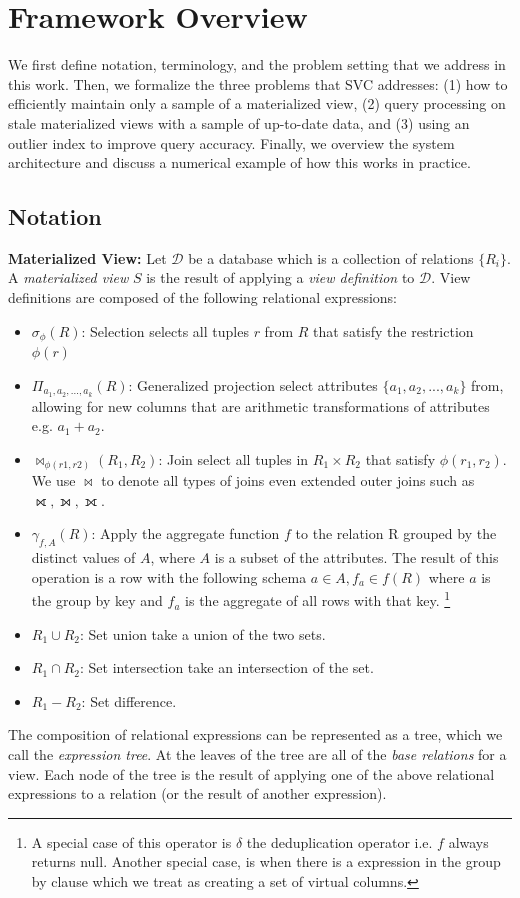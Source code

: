 \section{Framework Overview}\label{sec-arch}
We first define notation, terminology, and the problem setting that we address in this work.
Then, we formalize the three problems that SVC addresses: (1) how to efficiently maintain only a sample of a materialized view, (2) query processing on stale materialized views with a sample of up-to-date data, and (3) using an outlier index to improve query accuracy.
Finally, we overview the system architecture and discuss a numerical example of how this works in practice.

\subsection{Notation}\label{notation}
\noindent \textbf{Materialized View:} Let $\mathcal{D}$ be a database which is a collection of relations $\{R_i\}$. A \emph{materialized view} $S$ is the result of applying a \emph{view definition} to $\mathcal{D}$. 
View definitions are composed of the following relational expressions:
\begin{itemize}[noitemsep] \sloppy
	\item $\sigma_{\phi}(R)$: Selection selects all tuples $r$ from $R$ that satisfy the restriction $\phi (r)$ 
	\item $\Pi_{a_1,a_2,...,a_k}(R)$: Generalized projection select attributes $\{a_1,a_2,...,a_k\}$ from, allowing for new columns that are arithmetic transformations of attributes e.g. $a_1+a_2$.
	\item $\bowtie_{\phi (r1,r2)}(R_1,R_2)$: Join select all tuples in $R_1 \times R_2$ that satisfy $\phi (r_1,r_2)$. We use $\bowtie$ to denote all types of joins even extended outer joins such as $\rightouterjoin,\leftouterjoin,\fullouterjoin$.
	\item $\gamma_{f,A}(R)$: Apply the aggregate function $f$ to the relation R grouped by the distinct values of $A$, where $A$ is a subset of the attributes. The result of this operation is a row with the following schema $a \in A, f_a \in f(R)$ where $a$ is the group by key and $f_a$ is the aggregate of all rows with that key.   \footnote{A special case of this operator is $\delta$ the deduplication operator i.e. $f$ always returns null. Another special case, is when there is a expression in the group by clause which we treat as creating a set of virtual columns.}
	\item $R_1 \cup R_2$: Set union take a union of the two sets.
	\item $R_1 \cap R_2$: Set intersection take an intersection of the set.
	\item $R_1 - R_2$: Set difference.
\end{itemize}
The composition of relational expressions can be represented as a tree, which we call the \emph{expression tree}.
At the leaves of the tree are all of the \emph{base relations} for a view.
Each node of the tree is the result of applying one of the above relational expressions to a relation (or the result of another expression).

